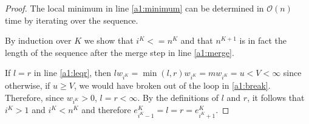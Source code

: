 \documentclass[11pt,a4paper]{article}
\newcommand{\bO}{\mathcal{O}}
\begin{document}
\begin{proof}
The local minimum in line \ref{a1:minimum} can be determined in $\bO(n)$ time by iterating over the sequence.

By induction over $K$ we show that $i^K <= n^K$ and that $n^{K+1}$ is in fact the length of the sequence after the merge step in line \ref{a1:merge}.

If $l = r$ in line \ref{a1:leqr}, then $lw_{i^K} = \min(l,r)w_{i^K} = mw_{i^K} = u < V < \infty$ since otherwise, if $u \ge V$, we would have broken out of the loop in \ref{a1:break}.
Therefore, since $w_{i^K} > 0$, $l = r < \infty$.
By the definitions of $l$ and $r$, it follows that $i^K > 1$ and $i^K < n^K$ and therefore
$e_{i^K-1}^K = l = r = e_{i^K+1}^K$.

\end{proof}
\end{document}
